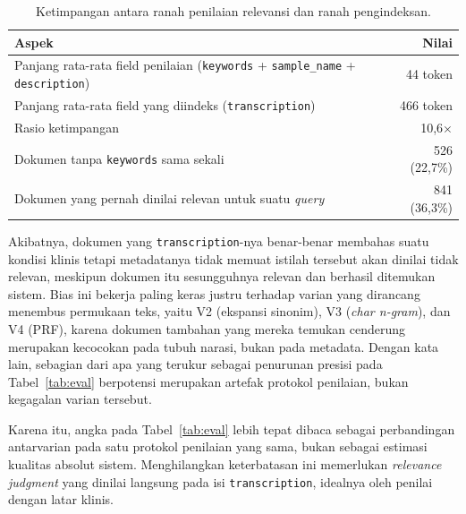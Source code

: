 \documentclass[a4paper,12pt]{article}
\begin{document}
\begin{table}[h]
  \centering
  \caption{Ketimpangan antara ranah penilaian relevansi dan ranah pengindeksan.}
  \label{tab:keterbatasan}
  \begin{tabular}{|>{\raggedright\arraybackslash}p{10.2cm}|r|}
    \hline
    \textbf{Aspek} & \textbf{Nilai} \\
    \hline
    Panjang rata-rata field penilaian (\texttt{keywords} + \texttt{sample\_name} + \texttt{description}) & 44 token \\
    \hline
    Panjang rata-rata field yang diindeks (\texttt{transcription}) & 466 token \\
    \hline
    Rasio ketimpangan & 10,6$\times$ \\
    \hline
    Dokumen tanpa \texttt{keywords} sama sekali & 526 (22,7\%) \\
    \hline
    Dokumen yang pernah dinilai relevan untuk suatu \textit{query} & 841 (36,3\%) \\
    \hline
  \end{tabular}
\end{table}

Akibatnya, dokumen yang \texttt{transcription}-nya benar-benar membahas suatu kondisi klinis tetapi metadatanya tidak memuat istilah tersebut akan dinilai tidak relevan, meskipun dokumen itu sesungguhnya relevan dan berhasil ditemukan sistem. Bias ini bekerja paling keras justru terhadap varian yang dirancang menembus permukaan teks, yaitu V2 (ekspansi sinonim), V3 (\textit{char n-gram}), dan V4 (PRF), karena dokumen tambahan yang mereka temukan cenderung merupakan kecocokan pada tubuh narasi, bukan pada metadata. Dengan kata lain, sebagian dari apa yang terukur sebagai penurunan presisi pada Tabel~\ref{tab:eval} berpotensi merupakan artefak protokol penilaian, bukan kegagalan varian tersebut.

Karena itu, angka pada Tabel~\ref{tab:eval} lebih tepat dibaca sebagai perbandingan antarvarian pada satu protokol penilaian yang sama, bukan sebagai estimasi kualitas absolut sistem. Menghilangkan keterbatasan ini memerlukan \textit{relevance judgment} yang dinilai langsung pada isi \texttt{transcription}, idealnya oleh penilai dengan latar klinis.
\end{document}
